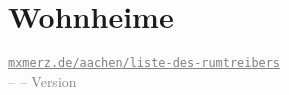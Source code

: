 \documentclass[8pt]{article}
\begin{document}
\section{Wohnheime}
\label{sec:wohnheime}

\begin{locations}
\end{locations}

%

\vfill
\centering
\makeatletter
{\small \textcolor{gray}{
	\texttt{\underline{mxmerz.de/aachen/liste-des-rumtreibers}} \\
	\@author{} -- \@date{} -- Version \theVersion
}\par}
\makeatother
\end{document}
